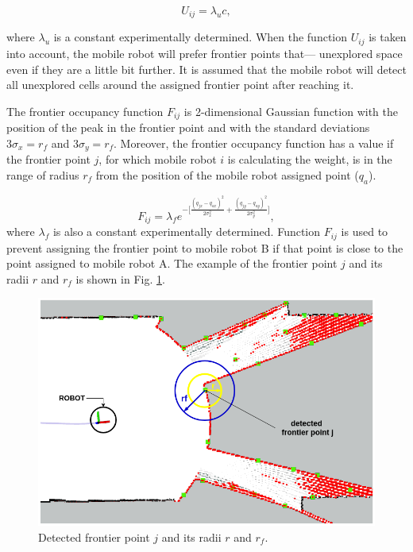 \documentclass[letterpaper, 10 pt, conference]{ieeeconf}  %
\begin{document}
\begin{equation}
    U_{ij} = \lambda_{u}c,
\end{equation}

where $\lambda_{u}$ is a constant experimentally determined. When the function $U_{ij}$ is taken into account, the mobile robot will prefer frontier points that--- unexplored space even if they are a little bit further. 
It is assumed that the mobile robot will detect all unexplored cells around the assigned frontier point after reaching it. 

The frontier occupancy function $F_{ij}$ is 2-dimensional Gaussian function with the position of the peak in the frontier point and with the standard deviations $3\sigma_{x}=r_{f}$ and $3\sigma_{y}=r_{f}$. Moreover, the frontier occupancy function has a value if the frontier point $j$, for which mobile robot $i$ is calculating the weight, is in the range of radius $r_{f}$ from the position of the mobile robot assigned point ($q_{a}$). 

\begin{equation}
    F_{ij} =  \lambda_{f} e^{-\Big[\frac{(q_{jx} - q_{ax})^2}{2\sigma_{x}^2} + \frac{(q_{jy} - q_{ay})^2}{2\sigma_{y}^2}\Big]},
\end{equation}
where $\lambda_{f}$  is also  a constant experimentally determined. Function $F_{ij}$ is used to prevent assigning the frontier point to mobile robot B if that point is close to the point assigned to mobile robot A. The example of the frontier point $j$ and its radii $r$ and $r_{f}$ is shown in Fig. \ref{fig:radijusi}.

\begin{figure}[b!]
	\centering\includegraphics[width=0.85\columnwidth]{robot_and_radius.png}
	\caption{Detected frontier point $j$ and its radii $r$ and $r_{f}$.}
	\label{fig:radijusi}
\end{figure}
\end{document}
